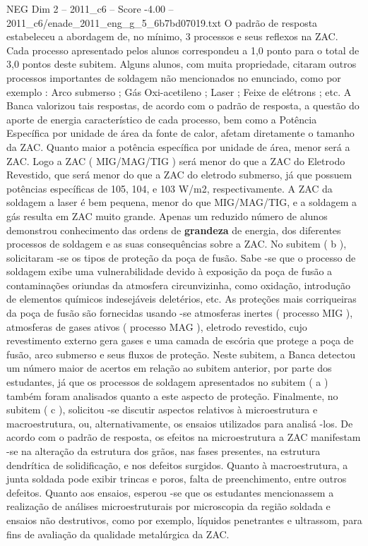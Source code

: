 \begin{textsample}{NEG Dim 2 – 2011\_c6 – Score -4.00 – 2011\_c6/enade\_2011\_eng\_g\_5\_6b7bd07019.txt}
O padrão de resposta estabeleceu a abordagem de, no mínimo, 3 processos e seus reflexos na ZAC.
Cada processo apresentado pelos alunos correspondeu a 1,0 ponto para o total de 3,0 pontos deste subitem.
Alguns alunos, com muita propriedade, citaram outros processos importantes de soldagem não mencionados no enunciado, como por exemplo : Arco submerso ; Gás Oxi-acetileno ; Laser ; Feixe de elétrons ; etc.
A Banca valorizou tais respostas, de acordo com o padrão de resposta, a questão do aporte de energia característico de cada processo, bem como a Potência Específica por unidade de área da fonte de calor, afetam diretamente o tamanho da ZAC.
Quanto maior a potência específica por unidade de área, menor será a ZAC.
Logo a ZAC ( MIG/MAG/TIG ) será menor do que a ZAC do Eletrodo Revestido, que será menor do que a ZAC do eletrodo submerso, já que possuem potências específicas de 105, 104, e 103 W/m2, respectivamente.
A ZAC da soldagem a laser é bem pequena, menor do que MIG/MAG/TIG, e a soldagem a gás resulta em ZAC muito grande.
Apenas um reduzido número de alunos demonstrou conhecimento das ordens de \textbf{grandeza} de energia, dos diferentes processos de soldagem e as suas consequências sobre a ZAC.
No subitem ( b ), solicitaram -se os tipos de proteção da poça de fusão.
Sabe -se que o processo de soldagem exibe uma vulnerabilidade devido à exposição da poça de fusão a contaminações oriundas da atmosfera circunvizinha, como oxidação, introdução de elementos químicos indesejáveis deletérios, etc.
As proteções mais corriqueiras da poça de fusão são fornecidas usando -se atmosferas inertes ( processo MIG ), atmosferas de gases ativos ( processo MAG ), eletrodo revestido, cujo revestimento externo gera gases e uma camada de escória que protege a poça de fusão, arco submerso e seus fluxos de proteção.
Neste subitem, a Banca detectou um número maior de acertos em relação ao subitem anterior, por parte dos estudantes, já que os processos de soldagem apresentados no subitem ( a ) também foram analisados quanto a este aspecto de proteção.
Finalmente, no subitem ( c ), solicitou -se discutir aspectos relativos à microestrutura e macroestrutura, ou, alternativamente, os ensaios utilizados para analisá -los.
De acordo com o padrão de resposta, os efeitos na microestrutura a ZAC manifestam -se na alteração da estrutura dos grãos, nas fases presentes, na estrutura dendrítica de solidificação, e nos defeitos surgidos.
Quanto à macroestrutura, a junta soldada pode exibir trincas e poros, falta de preenchimento, entre outros defeitos.
Quanto aos ensaios, esperou -se que os estudantes mencionassem a realização de análises microestruturais por microscopia da região soldada e ensaios não destrutivos, como por exemplo, líquidos penetrantes e ultrassom, para fins de avaliação da qualidade metalúrgica da ZAC.

\end{textsample}
